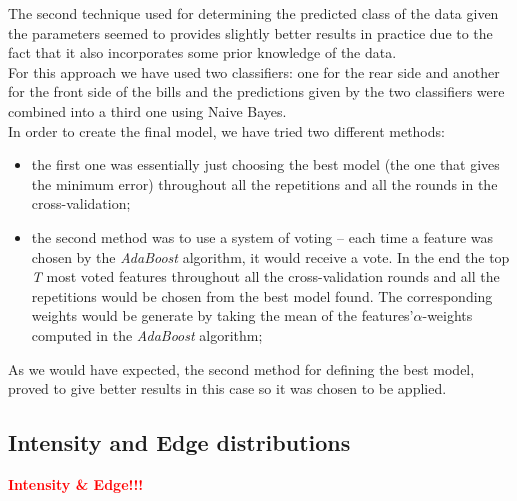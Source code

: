 \documentclass[11pt,twocolumn]{article}
\newcommand{\todo}[1]{\textcolor{red}{\textbf{#1}}}
\begin{document}
The second technique used for determining the predicted class of the data given the parameters seemed to provides slightly better results in practice due to the fact that it also incorporates some prior knowledge of the data.\\  
 		\hspace*{10px}For this approach we have used two classifiers: one for the rear side and another for the front side of the bills and the predictions given by the two classifiers were combined into a third one using Naive Bayes.\\
		\hspace*{10px}In order to create the final model, we have tried two different methods: 
\begin{itemize}
\item the first one was essentially just choosing the best model (the one that gives the minimum error) throughout all the repetitions and all the rounds in the cross-validation;
\item the second method was to use a system of voting -- each time a feature was chosen by the \emph{AdaBoost} algorithm, it would receive a vote. In the end the top \emph{T} most voted features throughout all the cross-validation rounds and all the repetitions would be chosen from the best model found. The corresponding weights would be generate by taking the mean of the features\rq\@ $\alpha$-weights computed in the \emph{AdaBoost} algorithm;     
\end{itemize}
As we would have expected, the second method for defining the best model, proved to give better results in this case so it was chosen to be applied.
	
	\subsection{Intensity and Edge distributions}\label{sec:Intensity_Edge}
		\todo{\hspace*{10px}Intensity \& Edge!!!}\\
\end{document}
